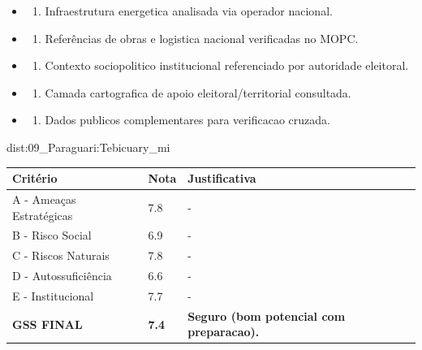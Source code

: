 {\begin{itemize}
\item
  \begin{enumerate}
  \def\labelenumi{\arabic{enumi})}
  \setcounter{enumi}{7}
  \tightlist
  \item
    Infraestrutura energetica analisada via operador nacional.
  \end{enumerate}
\item
  \begin{enumerate}
  \def\labelenumi{\arabic{enumi})}
  \setcounter{enumi}{8}
  \tightlist
  \item
    Referências de obras e logistica nacional verificadas no MOPC.
  \end{enumerate}
\item
  \begin{enumerate}
  \def\labelenumi{\arabic{enumi})}
  \setcounter{enumi}{9}
  \tightlist
  \item
    Contexto sociopolitico institucional referenciado por autoridade
    eleitoral.
  \end{enumerate}
\item
  \begin{enumerate}
  \def\labelenumi{\arabic{enumi})}
  \setcounter{enumi}{10}
  \tightlist
  \item
    Camada cartografica de apoio eleitoral/\allowbreak territorial consultada.
  \end{enumerate}
\item
  \begin{enumerate}
  \def\labelenumi{\arabic{enumi})}
  \setcounter{enumi}{11}
  \tightlist
  \item
    Dados publicos complementares para verificacao cruzada.
  \end{enumerate}
\end{itemize}}{dist:09_Paraguari:Tebicuary_mi}
\begin{table}[ht!]
\small \begin{tabular}{p{3.0cm}p{0.8cm}p{6.0cm}} \toprule
\textbf{Critério} & \textbf{Nota} & \textbf{Justificativa} \\ \midrule
A - Ameaças Estratégicas & 7.8 & - \\
B - Risco Social & 6.9 & - \\
C - Riscos Naturais & 7.8 & - \\
D - Autossuficiência & 6.6 & - \\
E - Institucional & 7.7 & - \\
\midrule \textbf{GSS FINAL} & \textbf{7.4} & \textbf{Seguro (bom potencial com preparacao).} \\ \bottomrule \end{tabular}
\end{table}

